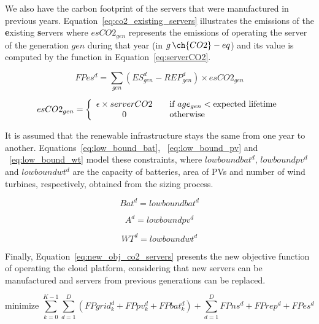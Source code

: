 We also have the carbon footprint of the servers that were manufactured in previous years. Equation~\eqref{eq:co2_existing_servers} illustrates the emissions of the \textbf{e}xisting \textbf{s}ervers where $esCO2_{gen}$ represents the emissions of operating the server of the generation $gen$ during that year (in $g\,\ch{CO2}-eq$) and its value is computed by the function in Equation~\eqref{eq:serverCO2}.


\begin{equation} \label{eq:co2_existing_servers}
FPes^d = \sum_{gen} (ES_{gen}^d - REP_{gen}^d)  \times esCO2_{gen}
\end{equation}


\begin{equation} \label{eq:serverCO2}
esCO2_{gen} =  \left\{ 
  \begin{array}{ c l }
    \epsilon \times serverCO2   & \quad \textrm{if $age_{gen}$}    < \textrm{expected lifetime}   \\
    0     & \quad \textrm{otherwise  } \\
  \end{array}
\right.
\end{equation}

It is assumed that the renewable infrastructure stays the same from one year to another. Equations~\eqref{eq:low_bound_bat},  ~\eqref{eq:low_bound_pv} and ~\eqref{eq:low_bound_wt} model these constraints, where $lowboundbat^d$, $lowboundpv^d$ and $lowboundwt^d$ are the capacity of batteries, area of PVs and number of wind turbines, respectively, obtained from the sizing process.

\begin{equation} \label{eq:low_bound_bat}
Bat^d = lowboundbat^d
\end{equation}

\begin{equation} \label{eq:low_bound_pv}
A^d = lowboundpv^d
\end{equation}

\begin{equation} \label{eq:low_bound_wt}
WT^d = lowboundwt^d
\end{equation}


Finally, Equation~\eqref{eq:new_obj_co2_servers} presents the new objective function of operating the cloud platform, considering that new servers can be manufactured and servers from previous generations can be replaced.

\begin{equation} \label{eq:new_obj_co2_servers}
\text{minimize }\sum_{k=0}^{K-1} \sum_{d=1}^D (FPgrid^d_k +  FPpv^d_k + FPbat^d_k) + \sum_{d=1}^D   FPns^d + FPrep^d + FPes^d 
\end{equation}


